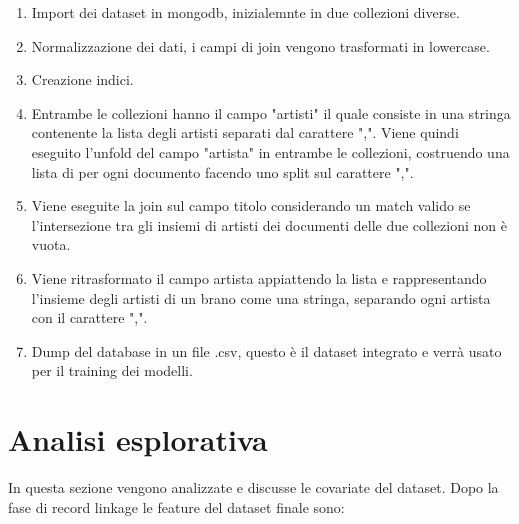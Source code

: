 \begin{enumerate}
	\item Import dei dataset in mongodb, inizialemnte in due collezioni diverse.
	\item Normalizzazione dei dati, i campi di join vengono trasformati in lowercase.
	\item Creazione indici.
	\item Entrambe le collezioni hanno il campo "artisti" il quale consiste in una stringa contenente la lista degli artisti separati dal carattere ",". Viene quindi eseguito l'unfold del campo "artista" in entrambe le collezioni, costruendo una lista di per ogni documento facendo uno split sul carattere ",".
	\item Viene eseguite la join sul campo titolo considerando un match valido se l'intersezione tra gli insiemi di artisti dei documenti delle due collezioni non è vuota.
	\item Viene ritrasformato il campo artista appiattendo la lista e rappresentando l'insieme degli artisti di un brano come una stringa, separando ogni artista con il carattere ",".
	\item Dump del database in un file .csv, questo è il dataset integrato e verrà usato per il training dei modelli.
\end{enumerate}



\section{Analisi esplorativa}
In questa sezione vengono analizzate e discusse le covariate del dataset. Dopo la fase di record linkage le feature del dataset finale sono:

